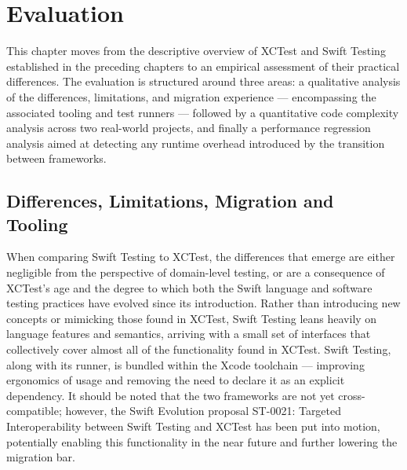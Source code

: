 %

\chapter{Evaluation}

This chapter moves from the descriptive overview of XCTest and Swift Testing established
in the preceding chapters to an empirical assessment of their practical differences.
The evaluation is structured around three areas: a qualitative analysis of the
differences, limitations, and migration experience --- encompassing the associated tooling
and test runners --- followed by a quantitative code complexity analysis across two
real-world projects, and finally a performance regression analysis aimed at detecting
any runtime overhead introduced by the transition between frameworks.

\section{Differences, Limitations, Migration and Tooling}

When comparing Swift Testing to XCTest, the differences that emerge are either
negligible from the perspective of domain-level testing, or are a consequence of
XCTest's age and the degree to which both the Swift language and software testing
practices have evolved since its introduction. Rather than introducing new concepts
or mimicking those found in XCTest, Swift Testing leans heavily on language features
and semantics, arriving with a small set of interfaces that collectively cover almost
all of the functionality found in XCTest. Swift Testing, along with its runner, is
bundled within the Xcode toolchain --- improving ergonomics of usage and removing the
need to declare it as an explicit dependency. It should be noted that the two
frameworks are not yet cross-compatible; however, the Swift Evolution proposal
ST-0021: Targeted Interoperability between Swift Testing and XCTest has been put into
motion, potentially enabling this functionality in the near future and further
lowering the migration bar.

